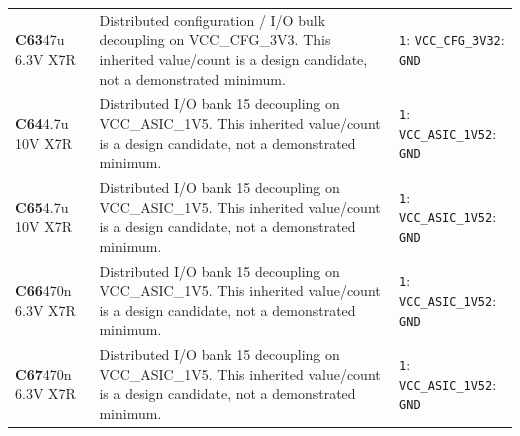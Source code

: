 \documentclass[11pt,a4paper]{article}
\begin{document}
\begin{longtable}{@{}P{27mm}P{84mm}P{57mm}@{}}
\textbf{C63}\newline 47u 6.3V X7R & Distributed configuration / I/O bulk decoupling on VCC\_CFG\_3V3. This inherited value/count is a design candidate, not a demonstrated minimum. & \nolinkurl{1}: \nolinkurl{VCC_CFG_3V3}\newline \nolinkurl{2}: \nolinkurl{GND} \\
\textbf{C64}\newline 4.7u 10V X7R & Distributed I/O bank 15 decoupling on VCC\_ASIC\_1V5. This inherited value/count is a design candidate, not a demonstrated minimum. & \nolinkurl{1}: \nolinkurl{VCC_ASIC_1V5}\newline \nolinkurl{2}: \nolinkurl{GND} \\
\textbf{C65}\newline 4.7u 10V X7R & Distributed I/O bank 15 decoupling on VCC\_ASIC\_1V5. This inherited value/count is a design candidate, not a demonstrated minimum. & \nolinkurl{1}: \nolinkurl{VCC_ASIC_1V5}\newline \nolinkurl{2}: \nolinkurl{GND} \\
\textbf{C66}\newline 470n 6.3V X7R & Distributed I/O bank 15 decoupling on VCC\_ASIC\_1V5. This inherited value/count is a design candidate, not a demonstrated minimum. & \nolinkurl{1}: \nolinkurl{VCC_ASIC_1V5}\newline \nolinkurl{2}: \nolinkurl{GND} \\
\textbf{C67}\newline 470n 6.3V X7R & Distributed I/O bank 15 decoupling on VCC\_ASIC\_1V5. This inherited value/count is a design candidate, not a demonstrated minimum. & \nolinkurl{1}: \nolinkurl{VCC_ASIC_1V5}\newline \nolinkurl{2}: \nolinkurl{GND} \\

\end{longtable}
\end{document}
